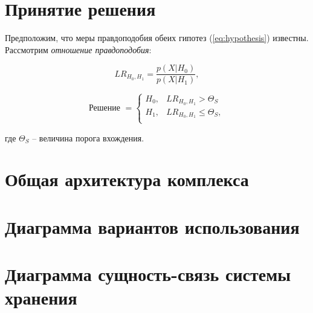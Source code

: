 \documentclass[12pt]{article}
\newcommand{\important}[1]{\emph{#1}}
\begin{document}
\begin{figure}[h!]
\end{figure}


\section{Принятие решения}

Предположим, что меры правдоподобия обеих гипотез (\ref{eq:hypothesis}) известны. Рассмотрим \important{отношение правдоподобия}:

\begin{equation}
\label{eq:lr}
LR_{H_0, H_1} = \frac{p(X|H_0)}{p(X|H_1)},
\end{equation}

\begin{equation}
\label{eq:decision}
\textrm{Решение } = \left\{ 
    \begin{array}{ll}
        H_0, & LR_{H_0, H_1} > \Theta_{S} \\
        H_1, & LR_{H_0, H_1} \leq \Theta_{S}, \\
    \end{array}
\right.
\end{equation}

\noindent где $\Theta_{S}$ -- величина порога вхождения.

\section{Общая архитектура комплекса}

\begin{figure}[h!]
\end{figure}

\section{Диаграмма вариантов использования}

\begin{figure}[h!]
\end{figure}

\section{Диаграмма сущность-связь системы хранения}

\begin{figure}[h!]
\end{figure}
\end{document}
